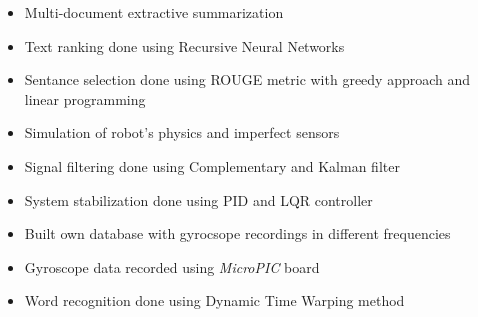 \documentclass[10pt,a4paper]{source/altacv}
\begin{document}
\divider



\begin{itemize}
  \item \small{Multi-document extractive summarization}
  \item \small{Text ranking done using Recursive Neural Networks}
  \item \small{Sentance selection done using ROUGE metric with greedy approach and linear programming}
  \\
  \smallskip
    
\end{itemize}

\divider



\begin{itemize}
    \item \small{Simulation of robot's physics and imperfect sensors}
    \item \small{Signal filtering done using Complementary and Kalman filter}
    \item \small{System stabilization done using PID and LQR controller}
    \\
    \smallskip
  \href{https://esveske.github.io/pdf/2017/PFE1705.pdf}{} 
\end{itemize}

\divider



\begin{itemize}
    \item \small{Built own database with gyrocsope recordings in different frequencies}
    \item \small{Gyroscope data recorded using \textit{MicroPIC} board}
    \item \small{Word recognition done using Dynamic Time Warping method}
    \\
    \smallskip
    \href{https://esveske.github.io/pdf/2016/PFE1605.pdf}{} 
\end{itemize}
\end{document}
